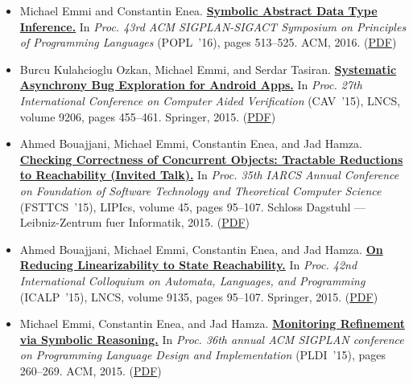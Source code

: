 \documentclass{article}
\begin{document}
\begin{itemize}[leftmargin=0cm,label={}]
    \item Michael Emmi and Constantin Enea. {\bf\href{%
    http://doi.acm.org/10.1145/2837614.2837645}{%
    Symbolic Abstract Data Type Inference.}} In \emph{ Proc. 43rd ACM SIGPLAN-SIGACT Symposium on Principles of Programming Languages } (POPL ’16), pages 513–525. ACM, 2016. (\href{https://michael-emmi.github.io/https://github.com/michael-emmi/research-papers/raw/master/conf-popl-EmmiE16.pdf}{PDF})


    \item Burcu Kulahcioglu Ozkan, Michael Emmi, and Serdar Tasiran. {\bf\href{%
    http://dx.doi.org/10.1007/978-3-319-21690-4_28}{%
    Systematic Asynchrony Bug Exploration for Android Apps.}} In \emph{ Proc. 27th International Conference on Computer Aided Verification } (CAV ’15), LNCS, volume 9206, pages 455–461. Springer, 2015. (\href{https://michael-emmi.github.io/https://github.com/michael-emmi/research-papers/raw/master/conf-cav-OzkanET15.pdf}{PDF})


    \item Ahmed Bouajjani, Michael Emmi, Constantin Enea, and Jad Hamza. {\bf\href{%
    http://dx.doi.org/10.4230/LIPIcs.FSTTCS.2015.2}{%
    Checking Correctness of Concurrent Objects: Tractable Reductions to Reachability (Invited Talk).}} In \emph{ Proc. 35th IARCS Annual Conference on Foundation of Software Technology and Theoretical Computer Science } (FSTTCS ’15), LIPIcs, volume 45, pages 95–107. Schloss Dagstuhl — Leibniz-Zentrum fuer Informatik, 2015. (\href{https://michael-emmi.github.io/https://github.com/michael-emmi/research-papers/raw/master/conf-fsttcs-BouajjaniEEH15.pdf}{PDF})


    \item Ahmed Bouajjani, Michael Emmi, Constantin Enea, and Jad Hamza. {\bf\href{%
    http://dx.doi.org/10.1007/978-3-662-47666-6_8}{%
    On Reducing Linearizability to State Reachability.}} In \emph{ Proc. 42nd International Colloquium on Automata, Languages, and Programming } (ICALP ’15), LNCS, volume 9135, pages 95–107. Springer, 2015. (\href{https://michael-emmi.github.io/https://github.com/michael-emmi/research-papers/raw/master/conf-icalp-BouajjaniEEH15.pdf}{PDF})


    \item Michael Emmi, Constantin Enea, and Jad Hamza. {\bf\href{%
    http://doi.acm.org/10.1145/2737924.2737983}{%
    Monitoring Refinement via Symbolic Reasoning.}} In \emph{ Proc. 36th annual ACM SIGPLAN conference on Programming Language Design and Implementation } (PLDI ’15), pages 260–269. ACM, 2015. (\href{https://michael-emmi.github.io/https://github.com/michael-emmi/research-papers/raw/master/conf-pldi-EmmiEH15.pdf}{PDF})



\end{itemize}
\end{document}
